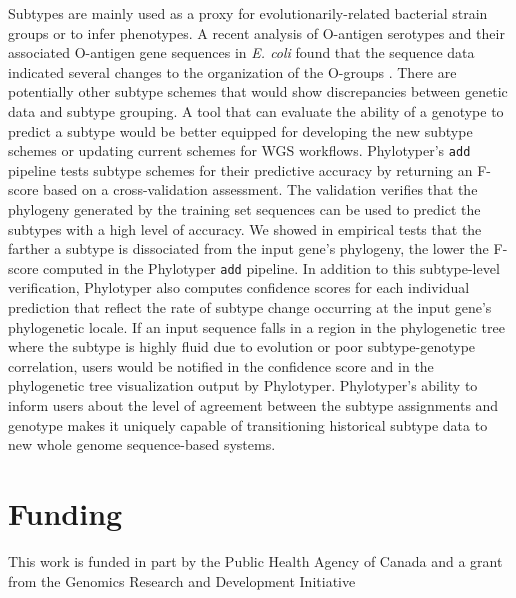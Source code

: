 \documentclass{bioinfo}
\begin{document}
Subtypes are mainly used as a proxy for evolutionarily-related bacterial strain groups or to infer phenotypes.
A recent analysis of O-antigen serotypes and their associated O-antigen gene sequences in \textit{E. coli} found that the sequence data indicated several changes to the organization of the O-groups \citep{DebRoy2016}.
There are potentially other subtype schemes that would show discrepancies between genetic data and subtype grouping.
A tool that can evaluate the ability of a genotype to predict a subtype would be better equipped for developing the new subtype schemes or updating current schemes for WGS workflows.
Phylotyper's \texttt{add} pipeline tests subtype schemes for their predictive accuracy by returning an F-score based on a cross-validation assessment.
The validation verifies that the phylogeny generated by the training set sequences can be used to predict the subtypes with a high level of accuracy.
We showed in empirical tests that the farther a subtype is dissociated from the input gene's phylogeny, the lower the F-score computed in the Phylotyper \texttt{add} pipeline.
In addition to this subtype-level verification, Phylotyper also computes confidence scores for each individual prediction that reflect the rate of subtype change occurring at the input gene's phylogenetic locale.
If an input sequence falls in a region in the phylogenetic tree where the subtype is highly fluid due to evolution or poor subtype-genotype correlation, users would be notified in the confidence score and in the phylogenetic tree visualization output by Phylotyper. 
Phylotyper's ability to inform users about the level of agreement between the subtype assignments and genotype makes it uniquely capable of transitioning historical subtype data to new whole genome sequence-based systems.\vspace*{-10pt}


\section*{Funding}

This work is funded in part by the Public Health Agency of Canada and a grant from the Genomics Research and Development Initiative\vspace*{-12pt}




\end{document}
